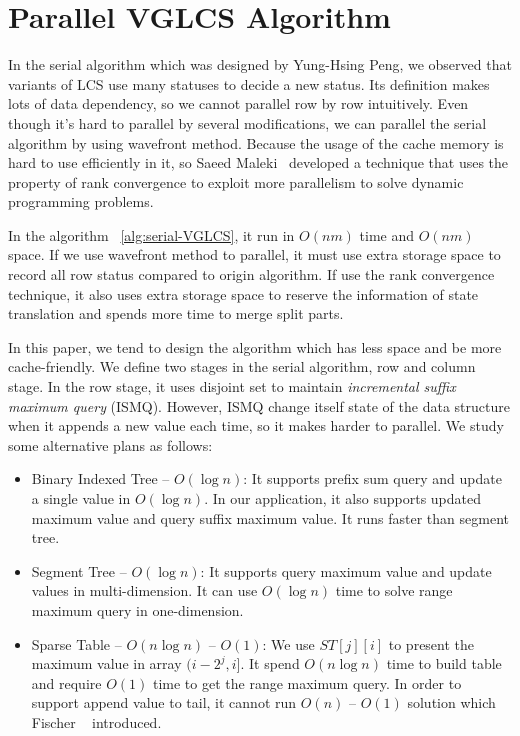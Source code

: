 \section{Parallel VGLCS Algorithm} %
\label{sec:parallelSerial}

In the serial algorithm which was designed by Yung-Hsing Peng, we
observed that variants of LCS use many statuses to decide a new
status. Its definition makes lots of data dependency, so we cannot
parallel row by row intuitively.  Even though it's hard to parallel by
several modifications, we can parallel the serial algorithm by using
wavefront method.  Because the usage of the cache memory is hard to
use efficiently in it, so Saeed Maleki~\cite{Maleki2016EfficientPU} developed a
technique that uses the property of rank convergence to exploit more
parallelism to solve dynamic programming problems.



In the algorithm ~\ref{alg:serial-VGLCS}, it run in $O(nm)$
time and $O(nm)$ space.  If we use wavefront method to parallel, it
must use extra storage space to record all row status compared to
origin algorithm.  If use the rank convergence technique, it also uses
extra storage space to reserve the information of state translation
and spends more time to merge split parts.

In this paper, we tend to design the algorithm which has less space
and be more cache-friendly.  We define two stages in the serial
algorithm, row and column stage.  In the row stage, it uses disjoint
set to maintain \emph{incremental suffix maximum query} (ISMQ).
However, ISMQ change itself state of the data structure when it
appends a new value each time, so it makes harder to parallel.  We
study some alternative plans as follows:

\begin{itemize}
  \item 

Binary Indexed Tree -- $O(\log n)$: It supports prefix sum query and
update a single value in $O(\log n)$.  In our application, it also
supports updated maximum value and query suffix maximum value.  It runs
faster than segment tree.

  \item 

Segment Tree -- $O(\log n)$: It supports query maximum value and
update values in multi-dimension.  It can use $O(\log n)$ time to
solve range maximum query in one-dimension.

  \item 

Sparse Table -- $O(n \log n)$ -- $O(1)$: We use $ST[j][i]$ to present
the maximum value in array $(i-2^j,i]$.  It spend $O(n \log n)$ time
to build table and require $O(1)$ time to get the range maximum query.
In order to support append value to tail, it cannot run $O(n)$ --
$O(1)$ solution which Fischer ~\cite{Fischer2006TheoreticalAP} introduced.

\end{itemize}

